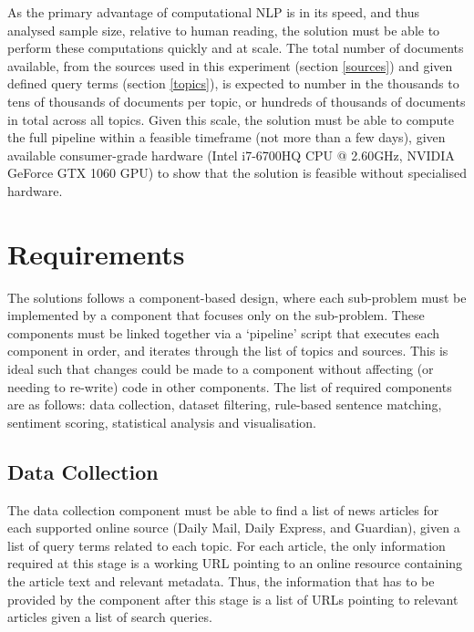 \documentclass{report}
\begin{document}
As the primary advantage of computational NLP is in its speed, and thus analysed sample size, relative to human reading, the solution must be able to perform these computations quickly and at scale.
The total number of documents available, from the sources used in this experiment (section \ref{sources}) and given defined query terms (section \ref{topics}), is expected to number in the thousands to tens of thousands of documents per topic, or hundreds of thousands of documents in total across all topics.
Given this scale, the solution must be able to compute the full pipeline within a feasible timeframe (not more than a few days), given available consumer-grade hardware (Intel i7-6700HQ CPU @ 2.60GHz, NVIDIA GeForce GTX 1060 GPU) to show that the solution is feasible without specialised hardware.

\section{Requirements} \label{Requirements}

The solutions follows a component-based design, where each sub-problem must be implemented by a component that focuses only on the sub-problem.
These components must be linked together via a `pipeline' script that executes each component in order, and iterates through the list of topics and sources.
This is ideal such that changes could be made to a component without affecting (or needing to re-write) code in other components.
The list of required components are as follows: data collection, dataset filtering, rule-based sentence matching, sentiment scoring, statistical analysis and visualisation.


\subsection{Data Collection} \label{req-data-collection}  %

The data collection component must be able to find a list of news articles for each supported online source (Daily Mail, Daily Express, and Guardian), given a list of query terms related to each topic.
For each article, the only information required at this stage is a working URL pointing to an online resource containing the article text and relevant metadata.
Thus, the information that has to be provided by the component after this stage is a list of URLs pointing to relevant articles given a list of search queries.
\end{document}
